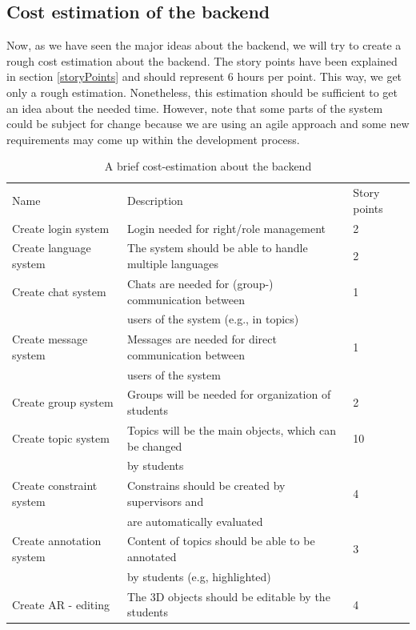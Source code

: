 \subsection{Cost estimation of the backend}
\label{backendEstimation}
Now, as we have seen the major ideas about the backend, we will try to create a rough cost estimation about the backend. The story points have been explained in section \ref{storyPoints} and should represent 6 hours per point. This way, we get only a rough estimation. Nonetheless, this  estimation should be sufficient to get an idea about the needed time. However, note that some parts of the system could be subject for change because we are using an agile approach and some new requirements may come up within the development process.

 \begin{table}[h]
\scriptsize
 \caption{A brief cost-estimation about the backend}
 \begin{tabular}{lll}
	\toprule
  Name & Description & Story points \\ 
\cmidrule(rl){1-1}\cmidrule(rl){2-2}\cmidrule(rl){3-3}
	Create login system		&	Login needed for right/role management			&	2 \\	
	Create language system	&	The system should be able to handle multiple languages&	2 \\	
	Create chat system		&	Chats are needed for (group-) communication between &	1 \\	
		 				&	users of the system (e.g., in topics)					&	 \\	
	Create message system &	Messages are needed for direct communication between&	1 \\
	 					&	users of the system 							&	 \\		
  	Create group system 	& 	Groups will be needed for organization of students 	& 	2 \\
  	Create topic system 	& 	Topics will be the main objects, which can be changed  	& 	10 \\
  	 					& 	by students  								 	&	   \\
	Create constraint system  &	Constrains should be created by supervisors and 		&	4 \\
						&	are automatically evaluated						&	   \\	
  	Create annotation system & 	Content of topics should be able to be annotated  		& 	3 \\
  	 					& 	by students  (e.g, highlighted)						&	   \\
  	Create \ac{AR} - editing  & 	The 3D objects should be editable by the students 	& 	4 \\

\end{tabular}
\end{table}
